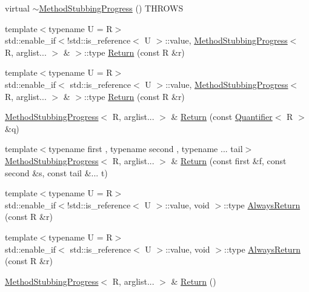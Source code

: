 \begin{DoxyCompactItemize}
\item 
virtual \mbox{\hyperlink{structfakeit_1_1MethodStubbingProgress_aed2c96ce537706935976943354c49616}{$\sim$\+Method\+Stubbing\+Progress}} () T\+H\+R\+O\+WS
\item 
{\footnotesize template$<$typename U  = R$>$ }\\std\+::enable\+\_\+if$<$!std\+::is\+\_\+reference$<$ U $>$\+::value, \mbox{\hyperlink{structfakeit_1_1MethodStubbingProgress}{Method\+Stubbing\+Progress}}$<$ R, arglist... $>$ \& $>$\+::type \mbox{\hyperlink{structfakeit_1_1MethodStubbingProgress_ab97be63c322887db40cb788d28875fea}{Return}} (const R \&r)
\item 
{\footnotesize template$<$typename U  = R$>$ }\\std\+::enable\+\_\+if$<$ std\+::is\+\_\+reference$<$ U $>$\+::value, \mbox{\hyperlink{structfakeit_1_1MethodStubbingProgress}{Method\+Stubbing\+Progress}}$<$ R, arglist... $>$ \& $>$\+::type \mbox{\hyperlink{structfakeit_1_1MethodStubbingProgress_ab20141c6f552c3aa3399660c520c2ba4}{Return}} (const R \&r)
\item 
\mbox{\hyperlink{structfakeit_1_1MethodStubbingProgress}{Method\+Stubbing\+Progress}}$<$ R, arglist... $>$ \& \mbox{\hyperlink{structfakeit_1_1MethodStubbingProgress_acb4d4db8208a8eaadff77e7cbf3775db}{Return}} (const \mbox{\hyperlink{structfakeit_1_1Quantifier}{Quantifier}}$<$ R $>$ \&q)
\item 
{\footnotesize template$<$typename first , typename second , typename ... tail$>$ }\\\mbox{\hyperlink{structfakeit_1_1MethodStubbingProgress}{Method\+Stubbing\+Progress}}$<$ R, arglist... $>$ \& \mbox{\hyperlink{structfakeit_1_1MethodStubbingProgress_ae8417ec5f29f70be1ae914755b05e4db}{Return}} (const first \&f, const second \&s, const tail \&... t)
\item 
{\footnotesize template$<$typename U  = R$>$ }\\std\+::enable\+\_\+if$<$!std\+::is\+\_\+reference$<$ U $>$\+::value, void $>$\+::type \mbox{\hyperlink{structfakeit_1_1MethodStubbingProgress_a268ca122b518c0a34e80535d8f457549}{Always\+Return}} (const R \&r)
\item 
{\footnotesize template$<$typename U  = R$>$ }\\std\+::enable\+\_\+if$<$ std\+::is\+\_\+reference$<$ U $>$\+::value, void $>$\+::type \mbox{\hyperlink{structfakeit_1_1MethodStubbingProgress_a84cf6a4bf307cf8d49efb69b014e9b11}{Always\+Return}} (const R \&r)
\item 
\mbox{\hyperlink{structfakeit_1_1MethodStubbingProgress}{Method\+Stubbing\+Progress}}$<$ R, arglist... $>$ \& \mbox{\hyperlink{structfakeit_1_1MethodStubbingProgress_a4743b7e25e98cd6a2be2c03b7a9416d4}{Return}} ()

\end{DoxyCompactItemize}
